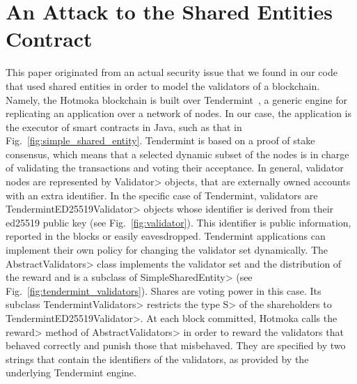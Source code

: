 \section{An Attack to the Shared Entities Contract}\label{sec:attack}

This paper originated from an actual security issue that we found in our code
that used shared entities in order to model the validators of a blockchain.
Namely, the Hotmoka blockchain is built over Tendermint~\cite{Kwon14}, a
generic engine for replicating an application over a network of nodes. In our case,
the application is the executor of smart contracts in Java, such as that in
Fig.~\ref{fig:simple_shared_entity}. Tendermint is based on a proof of stake
consensus, which means that a selected dynamic subset of the nodes is in charge of
validating the transactions and voting their acceptance. In general, validator nodes are
represented by \<Validator> objects, that are externally owned accounts
with an extra identifier. In the specific case of Tendermint,
validators are \<TendermintED25519Validator> objects whose
identifier is derived from their ed25519 public key (see Fig.~\ref{fig:validator}).
This identifier is public information, reported in the blocks or easily eavesdropped.
Tendermint applications can implement their own
policy for changing the validator set dynamically.
The \<AbstractValidators> class implements the validator set
and the distribution of the reward and is a subclass of \<SimpleSharedEntity>
(see Fig.~\ref{fig:tendermint_validators}).
Shares are voting power in this case.
Its subclass \<TendermintValidators> restricts the type \<S> of the shareholders
to \<TendermintED25519Validator>.
At each block committed, Hotmoka calls the \<reward> method of \<AbstractValidators>
in order to reward the validators that behaved correctly
and punish those that misbehaved. They are specified by two strings
that contain the identifiers of the validators, as provided by the underlying
Tendermint engine.

